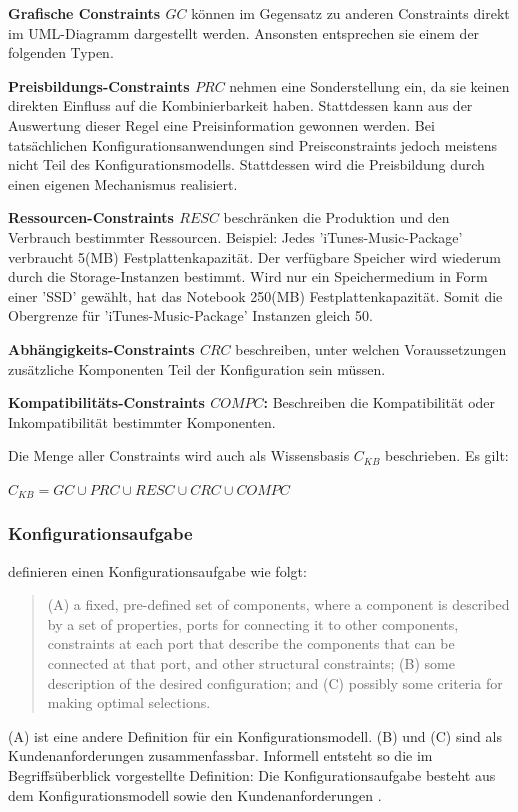\documentclass[12pt,a4paper,bibliography=totocnumbered,listof=totoc]{scrartcl}
\begin{document}
\begin{compactitem}
\item \textbf{Grafische Constraints $GC$} können im Gegensatz zu anderen Constraints direkt im UML-Diagramm dargestellt werden. Ansonsten entsprechen sie einem der folgenden Typen.
\item \textbf{Preisbildungs-Constraints $PRC$} nehmen eine Sonderstellung ein, da sie keinen direkten Einfluss auf die Kombinierbarkeit haben. Stattdessen kann aus der Auswertung dieser Regel eine Preisinformation gewonnen werden. Bei tatsächlichen Konfigurationsanwendungen sind Preisconstraints jedoch meistens nicht Teil des Konfigurationsmodells. Stattdessen wird die Preisbildung durch einen eigenen Mechanismus realisiert.
\item \textbf{Ressourcen-Constraints $RESC$} beschränken die Produktion und den Verbrauch bestimmter Ressourcen. Beispiel:  Jedes 'iTunes-Music-Package' verbraucht 5(MB) Festplattenkapazität. Der verfügbare Speicher wird wiederum durch die Storage-Instanzen bestimmt. Wird nur ein Speichermedium in Form einer 'SSD' gewählt, hat das Notebook 250(MB) Festplattenkapazität. Somit die Obergrenze für 'iTunes-Music-Package' Instanzen gleich 50.
\item \textbf{Abhängigkeits-Constraints $CRC$} beschreiben, unter welchen Voraussetzungen zusätzliche Komponenten Teil der Konfiguration sein müssen.
\item \textbf{Kompatibilitäts-Constraints $COMPC$:} Beschreiben die Kompatibilität  oder Inkompatibilität bestimmter Komponenten.
\end{compactitem}

Die Menge aller Constraints wird auch als Wissensbasis $C_{KB}$ beschrieben. Es gilt:

 $C_{KB} = GC \cup PRC \cup RESC \cup CRC \cup COMPC$

\subsubsection{Konfigurationsaufgabe}
\citet{mittal89} definieren einen Konfigurationsaufgabe wie folgt:
\begin{quote}
(A) a fixed, pre-defined set of components, where a component is described by a set of properties, ports for connecting it to other components, constraints at each port that describe the components that can be connected at that port, and other structural constraints; (B) some description of the desired configuration; and (C) possibly some criteria for making optimal selections.
\end{quote}
(A) ist eine andere Definition für ein Konfigurationsmodell. (B) und (C) sind als Kundenanforderungen zusammenfassbar. Informell entsteht so die im Begriffsüberblick vorgestellte Definition: Die Konfigurationsaufgabe besteht aus dem Konfigurationsmodell sowie den Kundenanforderungen \citep{felferning14}.
\end{document}
